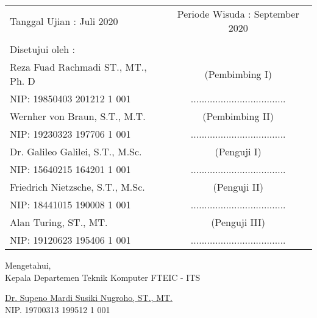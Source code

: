 \noindent
\begin{tabularx}{\textwidth}{X c}
  Tanggal Ujian : Juli 2020          & Periode Wisuda : September 2020     \\
                                     &                                     \\
  Disetujui oleh :                   &                                     \\
  Reza Fuad Rachmadi ST., MT., Ph. D & (Pembimbing I)                      \\
  NIP: 19850403 201212 1 001         & ................................... \\
  Wernher von Braun, S.T., M.T.      & (Pembimbing II)                     \\
  NIP: 19230323 197706 1 001         & ................................... \\
  Dr. Galileo Galilei, S.T., M.Sc.   & (Penguji I)                         \\
  NIP: 15640215 164201 1 001         & ................................... \\
  Friedrich Nietzsche, S.T., M.Sc.   & (Penguji II)                        \\
  NIP: 18441015 190008 1 001         & ................................... \\
  Alan Turing, ST., MT.              & (Penguji III)                       \\
  NIP: 19120623 195406 1 001         & ................................... \\
\end{tabularx}
\endgroup

\vspace{2ex}

\begin{center}
  Mengetahui, \\
  Kepala Departemen Teknik Komputer FTEIC - ITS \\

  \vspace{5ex}

  \underline{Dr. Supeno Mardi Susiki Nugroho, ST., MT.} \\
  NIP. 19700313 199512 1 001
\end{center}
\endgroup
